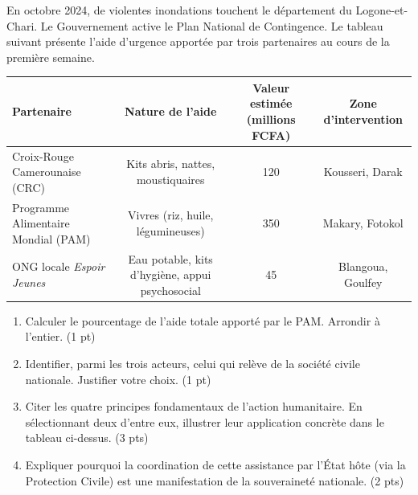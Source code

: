 \documentclass[11pt]{article}
\begin{document}
\begin{exercice}
En octobre 2024, de violentes inondations touchent le département du Logone-et-Chari. Le Gouvernement active le Plan National de Contingence. Le tableau suivant présente l'aide d'urgence apportée par trois partenaires au cours de la première semaine.

\begin{tabularx}{\linewidth}{|X|c|c|c|}
\hline
\textbf{Partenaire} & \textbf{Nature de l'aide} & \textbf{Valeur estimée (millions FCFA)} & \textbf{Zone d'intervention} \\
\hline
Croix-Rouge Camerounaise (CRC) & Kits abris, nattes, moustiquaires & 120 & Kousseri, Darak \\
\hline
Programme Alimentaire Mondial (PAM) & Vivres (riz, huile, légumineuses) & 350 & Makary, Fotokol \\
\hline
ONG locale \textit{Espoir Jeunes} & Eau potable, kits d'hygiène, appui psychosocial & 45 & Blangoua, Goulfey \\
\hline
\end{tabularx}

\begin{enumerate}
    \item Calculer le pourcentage de l'aide totale apporté par le PAM. Arrondir à l'entier. \hfill (1 pt)
    \item Identifier, parmi les trois acteurs, celui qui relève de la société civile nationale. Justifier votre choix. \hfill (1 pt)
    \item Citer les quatre principes fondamentaux de l'action humanitaire. En sélectionnant deux d'entre eux, illustrer leur application concrète dans le tableau ci-dessus. \hfill (3 pts)
    \item Expliquer pourquoi la coordination de cette assistance par l'État hôte (via la Protection Civile) est une manifestation de la souveraineté nationale. \hfill (2 pts)
\end{enumerate}
\end{exercice}
\end{document}
